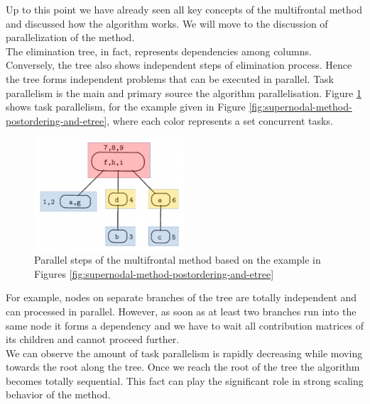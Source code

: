 Up to this point we have already seen all key concepts of the multifrontal method and discussed how the algorithm works. We will move to the discussion of parallelization of the method. \\


The elimination tree, in fact, represents dependencies among columns. Conversely, the tree also shows independent steps of elimination process. Hence the tree forms independent problems that can be executed in parallel. Task parallelism is the main and primary source the algorithm parallelisation. Figure \ref{fig:elimination-tree-mm-parallel-steps} shows task parallelism, for the example given in Figure \ref{fig:supernodal-method-postordering-and-etree}, where each color represents a set concurrent tasks.\\


\figpointer{\ref{fig:elimination-tree-mm-parallel-steps}}

\begin{figure}[htpb]
  \centering
  \includegraphics[width=0.5\textwidth]{figures/chapter-2/elimination-tree-parallel.png}
\caption{Parallel steps of the multifrontal method based on the example in Figures \ref{fig:supernodal-method-postordering-and-etree}}
\label{fig:elimination-tree-mm-parallel-steps}
\end{figure}


For example, nodes on separate branches of the tree are totally independent and can processed in parallel. However, as soon as at least two branches run into the same node it forms a dependency and we have to wait all contribution matrices of its children and cannot proceed further.\\ 


We can observe the amount of task parallelism is rapidly decreasing while moving towards the root along the tree. Once we reach the root of the tree the algorithm becomes totally sequential. This fact can play the significant role in strong scaling behavior of the method.\\


